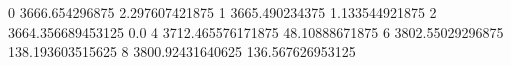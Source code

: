 0 3666.654296875 2.297607421875
1 3665.490234375 1.133544921875
2 3664.356689453125 0.0
4 3712.465576171875 48.10888671875
6 3802.55029296875 138.193603515625
8 3800.92431640625 136.567626953125
